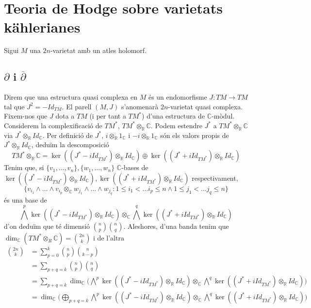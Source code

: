 \section{Teoria de Hodge sobre varietats kählerianes}
Sigui $M$ una $2n$-varietat amb un atles holomorf.
\subsection{$\partial$ i $\overline{\partial}$}
Direm que una estructura quasi complexa en $M$ és un endomorfisme $J:TM\rightarrow TM$ tal que $J^{2}=-Id_{TM}$. El parell $(M,J)$ s'anomenarà $2n$-varietat quasi complexa. Fixem-nos que $J$ dota a $TM$ (i per tant a $TM^{*}$) d'una estructura de $\mathbb{C}$-mòdul.\newline
Considerem la complexificació de $TM^{*}$, $TM^{*}\otimes_{\mathbb{R}}\mathbb{C}$. Podem estendre $J^{*}$ a $TM^{*}\otimes_{\mathbb{R}}\mathbb{C}$ via $J^{*}\otimes_{\mathbb{R}}Id_{\mathbb{C}}$. Per definició de $J^{*}$, $i\otimes_{\mathbb{R}}1_{\mathbb{C}}$ i $-i\otimes_{\mathbb{R}}1_{\mathbb{C}}$ són els valors propis de $J^{*}\otimes_{\mathbb{R}}Id_{\mathbb{C}}$, deduïm la descomposició
\begin{equation*}
    TM^{*}\otimes_{\mathbb{R}}\mathbb{C}
    =\ker((J^{*}-iId_{TM^{*}})\otimes_{\mathbb{R}}Id_{\mathbb{C}})
    \oplus\ker((J^{*}+iId_{TM^{*}})\otimes_{\mathbb{R}}Id_{\mathbb{C}})
\end{equation*}
Tenim que, si $\{v_{1},\ldots,v_{n}\},\{w_{1},\ldots,w_{n}\}$ $\mathbb{C}$-bases de $\ker((J^{*}-iId_{TM^{*}})\otimes_{\mathbb{R}}Id_{\mathbb{C}}),\ker((J^{*}+iId_{TM^{*}})\otimes_{\mathbb{R}}Id_{\mathbb{C}})$ respectivament,
\begin{equation*}
    \{v_{i_{1}}\wedge\ldots\wedge v_{i_{p}}\otimes_{\mathbb{C}}w_{j_{1}}\wedge\ldots\wedge w_{j_{q}}:1\leq i_{1}<\ldots i_{p}\leq n\land1\leq j_{1}<\ldots j_{q}\leq n\}
\end{equation*}
és una base de
\begin{equation*}
    \bigwedge^{p}\ker((J^{*}-iId_{TM^{*}})\otimes_{\mathbb{R}}Id_{\mathbb{C}})\otimes_{\mathbb{C}}\bigwedge^{q}\ker((J^{*}+iId_{TM^{*}})\otimes_{\mathbb{R}}Id_{\mathbb{C}})
\end{equation*}
d'on deduïm que té dimensió $\binom{n}{p}\binom{n}{q}$. Aleshores, d'una banda tenim que $\dim_{\mathbb{C}}(TM^{*}\otimes_{R}\mathbb{C})=\binom{2n}{k}$ i de l'altra
\begin{align*}
    \binom{2n}{k}
    &=\sum_{p=0}^{k}\binom{n}{p}\binom{n}{k-p}\\
    &=\sum_{p+q=k}\binom{n}{p}\binom{n}{q}\\
    &=\sum_{p+q=k}\dim_{\mathbb{C}}\Big(\bigwedge^{p}\ker((J^{*}-iId_{TM^{*}})\otimes_{\mathbb{R}}Id_{\mathbb{C}})
    \otimes_{\mathbb{C}}
    \bigwedge^{q}\ker((J^{*}+iId_{TM^{*}})\otimes_{\mathbb{R}}Id_{\mathbb{C}})\Big)\\
    &=\dim_{\mathbb{C}}\Big(\bigoplus_{p+q=k}\bigwedge^{p}\ker((J^{*}-iId_{TM^{*}})\otimes_{\mathbb{R}}Id_{\mathbb{C}})\otimes_{\mathbb{C}}\bigwedge^{q}\ker((J^{*}+iId_{TM^{*}})\otimes_{\mathbb{R}}Id_{\mathbb{C}})\Big)
\end{align*}
